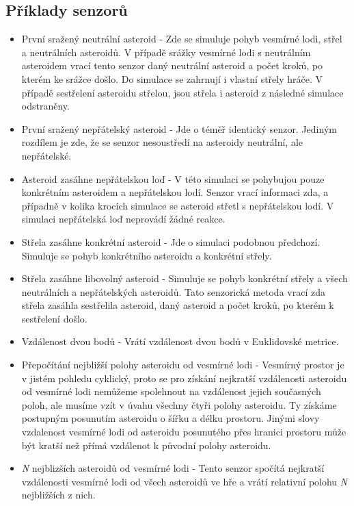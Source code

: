 \subsection{Příklady senzorů}
\begin{itemize}
    \item První sražený neutrální asteroid - Zde se simuluje pohyb vesmírné lodi, střel a neutrálních asteroidů. 
    V případě srážky vesmírné lodi s neutrálním asteroidem vrací tento senzor daný neutrální asteroid a počet kroků, po kterém ke srážce došlo.
    Do simulace se zahrnují i vlastní střely hráče. V případě sestřelení asteroidu střelou, jsou střela i asteroid z následné simulace odstraněny.    
    \item První sražený nepřátelský asteroid - Jde o téměř identický senzor. Jediným rozdílem je zde, že se senzor nesoustředí na asteroidy neutrální, ale nepřátelské.
    \item Asteroid zasáhne nepřátelskou loď - V této simulaci se pohybujou pouze konkrétním asteroidem a nepřátelskou lodí.
    Senzor vrací informaci zda, a případně v kolika krocích simulace se asteroid střetl s nepřátelskou lodí.
    V simulaci nepřátelská loď neprovádí žádné reakce.
    \item Střela zasáhne konkrétní asteroid - Jde o simulaci podobnou předchozí. Simuluje se pohyb konkrétního asteroidu a konkrétní střely.
    \item Střela zasáhne libovolný asteroid - Simuluje se pohyb konkrétní střely a všech neutrálních a nepřátelských asteroidů.
        Tato senzorická metoda vrací zda střela zasáhla sestřelila asteroid, daný asteroid a počet kroků, po kterém k sestřelení došlo.
    \item Vzdálenost dvou bodů - Vrátí vzdálenost dvou bodů v Euklidovské metrice.
    \item Přepočítání nejbližší polohy asteroidu od vesmírné lodi - 
        Vesmírný prostor je v jistém pohledu cyklický, proto se pro získání nejkratší vzdálenosti asteroidu od vesmírné lodi nemůžeme spolehnout na vzdálenost jejich současných poloh, ale musíme vzít v úvahu všechny čtyři polohy asteroidu.
        Ty získáme postupným posunutím asteroidu o šířku a délku prostoru.
        Jinými slovy vzdalenost vesmírné lodi od asteroidu posunutého přes hranici prostoru může být kratší než přímá vzdálenot k původní polohy asteroidu.
    \item \emph{N} nejblizších asteroidů od vesmírné lodi - Tento senzor spočítá nejkratší vzdálenosti vesmírné lodi od všech asteroidů ve hře a vrátí relativní polohu \emph{N} nejbližších z nich.
    
\end{itemize}


